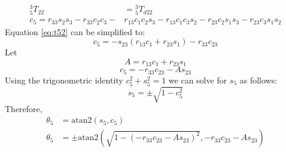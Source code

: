 \begin{equation} \label{eq:t52}
    \begin{aligned}
        {_5^{3}}T_{22}                    & ={_5^{3}}T_{d22}                                                      \\
        c_5=r_{33}s_2s_3 - r_{33}c_2c_3 - & r_{13}c_1c_2s_3 - r_{13}c_1c_3s_2 - r_{23}c_2s_1s_3 - r_{23}c_3s_1s_2
    \end{aligned}
\end{equation}
Equation \ref{eq:t52} can be simplified to:
\begin{equation} \label{eq:t53}
    c_5=-s_{23}(r_{13}c_1+r_{23}s_1)-r_{33}c_{23}
\end{equation}
Let
\begin{equation} \label{eq:t54}
    A=r_{13}c_1+r_{23}s_1
\end{equation}
\begin{equation} \label{eq:t55}
    c_5=-r_{33}c_{23}-As_{23}
\end{equation}
Using the trigonometric identity $c_5^2+s_5^2=1$ we can solve for $s_5$ as follows:
\begin{equation} \label{eq:t56}
    s_5=\pm\sqrt{1-c_5^2}
\end{equation}
Therefore,
\begin{equation} \label{eq:t57}
    \begin{aligned}
        \theta_5 & =\mathrm{atan2}(s_5, c_5)                                                                           \\
        \theta_5 & =\pm\mathrm{atan2}\left(\sqrt{1-\left(-r_{33}c_{23}-As_{23}\right)^2}, -r_{33}c_{23}-As_{23}\right)
    \end{aligned}
\end{equation}

